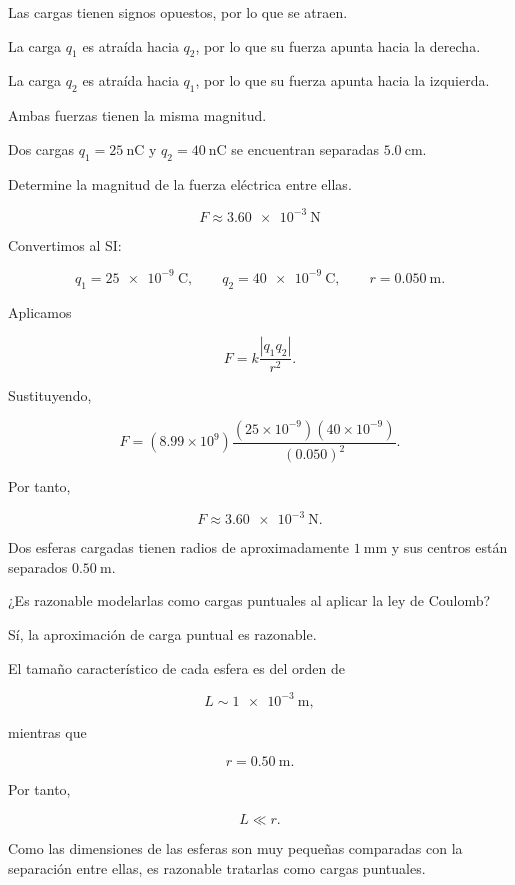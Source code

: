 \begin{explicacion}
Las cargas tienen signos opuestos, por lo que se atraen.

La carga \(q_1\) es atraída hacia \(q_2\), por lo que su fuerza apunta hacia
la derecha.

La carga \(q_2\) es atraída hacia \(q_1\), por lo que su fuerza apunta hacia
la izquierda.

Ambas fuerzas tienen la misma magnitud.
\end{explicacion}


\begin{ejercicio}
Dos cargas \(q_1=\SI{25}{\nano\coulomb}\) y
\(q_2=\SI{40}{\nano\coulomb}\) se encuentran separadas
\(\SI{5.0}{\centi\metre}\).

Determine la magnitud de la fuerza eléctrica entre ellas.
\end{ejercicio}

\begin{respuesta}
\[
\boxed{F\approx\SI{3.60e-3}{\newton}}
\]
\end{respuesta}

\begin{explicacion}
Convertimos al SI:

\[
q_1=\SI{25e-9}{\coulomb}, \qquad
q_2=\SI{40e-9}{\coulomb}, \qquad
r=\SI{0.050}{\metre}.
\]

Aplicamos

\[
F=k\frac{|q_1q_2|}{r^2}.
\]

Sustituyendo,

\[
F=(8.99\times10^9)
\frac{(25\times10^{-9})(40\times10^{-9})}{(0.050)^2}.
\]

Por tanto,

\[
\boxed{F\approx\SI{3.60e-3}{\newton}}.
\]
\end{explicacion}


\begin{ejercicio}
Dos esferas cargadas tienen radios de aproximadamente
\(\SI{1}{\milli\metre}\) y sus centros están separados
\(\SI{0.50}{\metre}\).

¿Es razonable modelarlas como cargas puntuales al aplicar la ley de Coulomb?
\end{ejercicio}

\begin{respuesta}
Sí, la aproximación de carga puntual es razonable.
\end{respuesta}

\begin{explicacion}
El tamaño característico de cada esfera es del orden de

\[
L\sim\SI{1e-3}{\metre},
\]

mientras que

\[
r=\SI{0.50}{\metre}.
\]

Por tanto,

\[
L\ll r.
\]

Como las dimensiones de las esferas son muy pequeñas comparadas con la
separación entre ellas, es razonable tratarlas como cargas puntuales.
\end{explicacion}


